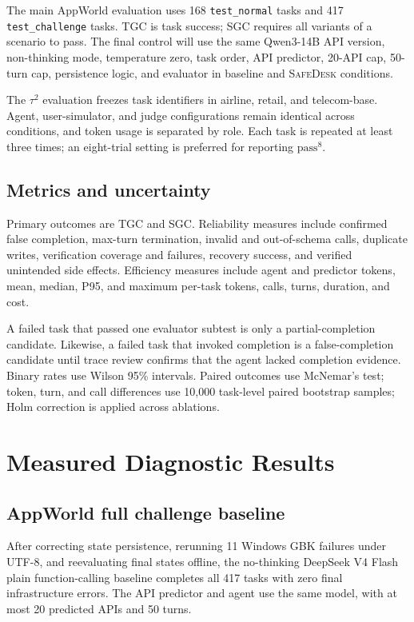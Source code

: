 \documentclass[10pt]{article}
\newcommand{\safedesk}{\textsc{SafeDesk}}
\begin{document}
The main AppWorld evaluation uses 168 \texttt{test\_normal} tasks and 417
\texttt{test\_challenge} tasks. TGC is task success; SGC requires all variants of
a scenario to pass. The final control will use the same Qwen3-14B API version,
non-thinking mode, temperature zero, task order, API predictor, 20-API cap,
50-turn cap, persistence logic, and evaluator in baseline and \safedesk{}
conditions.

The $\tau^2$ evaluation freezes task identifiers in airline, retail, and
telecom-base. Agent, user-simulator, and judge configurations remain identical
across conditions, and token usage is separated by role. Each task is repeated at
least three times; an eight-trial setting is preferred for reporting
$\mathrm{pass}^8$.

\subsection{Metrics and uncertainty}

Primary outcomes are TGC and SGC. Reliability measures include confirmed false
completion, max-turn termination, invalid and out-of-schema calls, duplicate
writes, verification coverage and failures, recovery success, and verified
unintended side effects. Efficiency measures include agent and predictor tokens,
mean, median, P95, and maximum per-task tokens, calls, turns, duration, and cost.

A failed task that passed one evaluator subtest is only a partial-completion
candidate. Likewise, a failed task that invoked completion is a false-completion
candidate until trace review confirms that the agent lacked completion evidence.
Binary rates use Wilson 95\% intervals. Paired outcomes use McNemar's test; token,
turn, and call differences use 10,000 task-level paired bootstrap samples; Holm
correction is applied across ablations.

\section{Measured Diagnostic Results}

\subsection{AppWorld full challenge baseline}

After correcting state persistence, rerunning 11 Windows GBK failures under
UTF-8, and reevaluating final states offline, the no-thinking DeepSeek V4 Flash
plain function-calling baseline completes all 417 tasks with zero final
infrastructure errors. The API predictor and agent use the same model, with at
most 20 predicted APIs and 50 turns.
\end{document}
